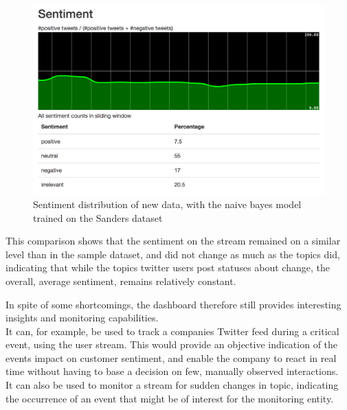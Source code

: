 \begin{figure}
    \centering
    \caption{Sentiment distribution of new data, with the naive bayes model trained on the Sanders dataset}
    \label{fig:sample_sentiment_distribtion_new}
    \includegraphics[width=\textwidth]{../images/dashboard_sentiment_sample.png}
\end{figure}

This comparison shows that the sentiment on the stream remained on a similar level than in the sample dataset,
and did not change as much as the topics did, indicating that while the topics twitter users post statuses about change,
the overall, average sentiment, remains relatively constant.

\par
In spite of some shortcomings, the dashboard therefore still provides interesting insights and monitoring capabilities.
\\
It can, for example, be used to track a companies Twitter feed during a critical event, using the user stream.
This would provide an objective indication of the events impact on customer sentiment,
and enable the company to react in real time without having to base a decision on few, manually observed interactions.
\\
It can also be used to monitor a stream for sudden changes in topic,
indicating the occurrence of an event that might be of interest for the monitoring entity.
